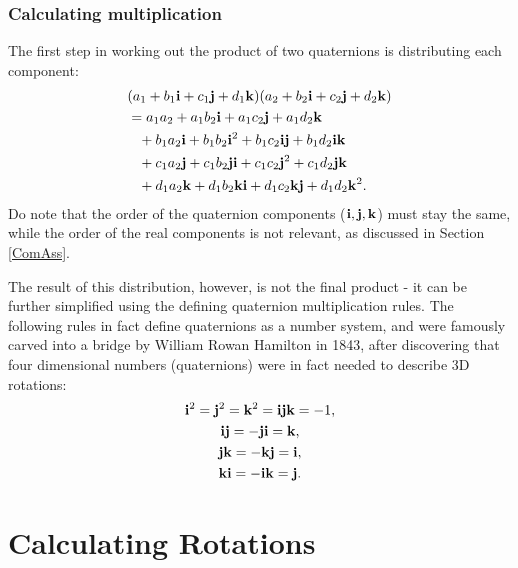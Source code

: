 \documentclass[12pt]{article}
\theoremstyle{definition}
\begin{document}
\subsubsection{Calculating multiplication}

The first step in working out the product of two quaternions is distributing each component:
\begin{equation}
    \begin{aligned}
        & (a_1 + b_1\vb{i} + c_1\vb{j} + d_1\vb{k})(a_2 + b_2\vb{i} + c_2\vb{j} + d_2\vb{k}) \\
        & = a_1a_2 + a_1b_2\vb{i} + a_1c_2\vb{j} + a_1d_2\vb{k} \\
        & \phantom{=} + b_1a_2\vb{i} + b_1b_2\vb{i}^2 + b_1c_2\vb{i}\vb{j} + b_1d_2\vb{i}\vb{k} \\
        & \phantom{=} + c_1a_2\vb{j} + c_1b_2\vb{j}\vb{i} + c_1c_2\vb{j}^2 + c_1d_2\vb{j}\vb{k} \\
        & \phantom{=} + d_1a_2\vb{k} + d_1b_2\vb{k}\vb{i} + d_1c_2\vb{k}\vb{j} + d_1d_2\vb{k}^2.
    \end{aligned}
\end{equation}
Do note that the order of the quaternion components ($\vb{i, j, k}$) must stay the same, while the order of the real components is not relevant, as discussed in Section \ref{ComAss}.

The result of this distribution, however, is not the final product - it can be further simplified using the defining quaternion multiplication rules. The following rules \cite{Eater} in fact define quaternions as a number system, and were famously carved into a bridge by William Rowan Hamilton in 1843, after discovering that four dimensional numbers (quaternions) were in fact needed to describe 3D rotations: \cite{QuaternionWiki}
\begin{subequations}
    \begin{gather}
        \vb{i}^2 = \vb{j}^2 = \vb{k}^2 = \vb{i}\vb{j}\vb{k} = -1, \\
        \vb{ij} = -\vb{ji} = \vb{k}, \\
        \vb{jk} = -\vb{kj} = \vb{i}, \\
        \vb{ki} = -\vb{ik} = \vb{j}.
    \end{gather}
\end{subequations}

\pagebreak
\section{Calculating Rotations}
\end{document}
